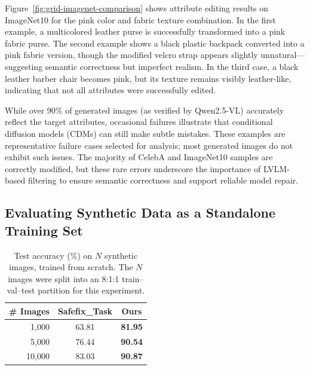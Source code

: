 \documentclass[10pt]{article} %
\newcommand{\qwen}{Qwen2.5-VL\xspace}
\begin{document}
Figure~\ref{fig:grid-imagenet-comparison} shows attribute editing results on ImageNet10 for the pink color and fabric texture combination. In the first example, a multicolored leather purse is successfully transformed into a pink fabric purse. The second example shows a black plastic backpack converted into a pink fabric version, though the modified velcro strap appears slightly unnatural—suggesting semantic correctness but imperfect realism. In the third case, a black leather barber chair becomes pink, but its texture remains visibly leather-like, indicating that not all attributes were successfully edited.

While over 90\% of generated images (as verified by \qwen) accurately reflect the target attributes, occasional failures illustrate that conditional diffusion models (CDMs) can still make subtle mistakes. These examples are representative failure cases selected for analysis; most generated images do not exhibit such issues. The majority of CelebA and ImageNet10 samples are correctly modified, but these rare errors underscore the importance of LVLM-based filtering to ensure semantic correctness and support reliable model repair. 





\subsection{Evaluating Synthetic Data as a Standalone Training Set}
\label{sec:synthetic_standalone} %

\begin{table}[h] %
\centering
\setlength{\tabcolsep}{6pt}
\renewcommand{\arraystretch}{1.1}
\small
\caption{Test accuracy (\%) on $N$ synthetic images, trained from scratch. The $N$ images were split into an 8:1:1 train--val--test partition for this experiment.}
\label{tab:valsplit_retrain} %
\begin{tabular}{rcc}
\toprule
\# Images & Safefix\_Task & \textbf{Ours} \\
\midrule
1{,}000  & 63.81 & \textbf{81.95} \\
5{,}000  & 76.44 & \textbf{90.54} \\
10{,}000 & 83.03 & \textbf{90.87} \\
\bottomrule
\end{tabular}
\vspace{-1em}
\end{table}
\end{document}
